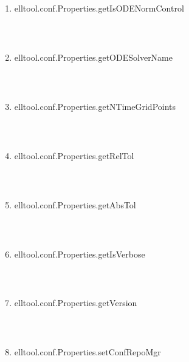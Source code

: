 \begin{enumerate}
\begin{lstlisting}
\end{lstlisting}
\fontfamily{\familydefault}
\selectfont
\item {elltool.conf.Properties.getIsODENormControl}
\selectfont
\begin{lstlisting}



\end{lstlisting}
\fontfamily{\familydefault}
\selectfont
\item {elltool.conf.Properties.getODESolverName}
\selectfont
\begin{lstlisting}



\end{lstlisting}
\fontfamily{\familydefault}
\selectfont
\item {elltool.conf.Properties.getNTimeGridPoints}
\selectfont
\begin{lstlisting}



\end{lstlisting}
\fontfamily{\familydefault}
\selectfont
\item {elltool.conf.Properties.getRelTol}
\selectfont
\begin{lstlisting}



\end{lstlisting}
\fontfamily{\familydefault}
\selectfont
\item {elltool.conf.Properties.getAbsTol}
\selectfont
\begin{lstlisting}



\end{lstlisting}
\fontfamily{\familydefault}
\selectfont
\item {elltool.conf.Properties.getIsVerbose}
\selectfont
\begin{lstlisting}



\end{lstlisting}
\fontfamily{\familydefault}
\selectfont
\item {elltool.conf.Properties.getVersion}
\selectfont
\begin{lstlisting}



\end{lstlisting}
\fontfamily{\familydefault}
\selectfont
\item {elltool.conf.Properties.setConfRepoMgr}
\selectfont
\begin{lstlisting}




\end{lstlisting}
\end{enumerate}
